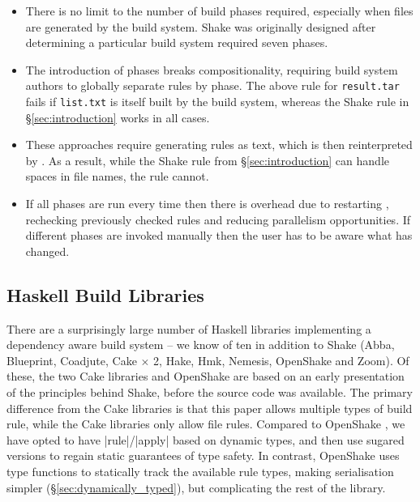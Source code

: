\begin{itemize}
\item There is no limit to the number of build phases required, especially when files are generated by the build system. Shake was originally designed after determining a particular build system required seven phases.
\item The introduction of phases breaks compositionality, requiring build system authors to globally separate rules by phase. The above rule for \texttt{result.tar} fails if \texttt{list.txt} is itself built by the build system, whereas the Shake rule in \S\ref{sec:introduction} works in all cases.
\item These approaches require generating \make{} rules as text, which is then reinterpreted by \make{}. As a result, while the Shake rule from \S\ref{sec:introduction} can handle spaces in file names, the \make{} rule cannot.
\item If all phases are run every time then there is overhead due to restarting \make{}, rechecking previously checked rules and reducing parallelism opportunities. If different phases are invoked manually then the user has to be aware what has changed.
\end{itemize}

\subsection{Haskell Build Libraries}

There are a surprisingly large number of Haskell libraries implementing a dependency aware build system -- we know of ten in addition to Shake (Abba, Blueprint, Coadjute, Cake $\times$ 2, Hake, Hmk, Nemesis, OpenShake and Zoom). Of these, the two Cake libraries and OpenShake are based on an early presentation of the principles behind Shake, before the source code was available. The primary difference from the Cake libraries is that this paper allows multiple types of build rule, while the Cake libraries only allow file rules. Compared to OpenShake \cite{openshake}, we have opted to have |rule|/|apply| based on dynamic types, and then use sugared versions to regain static guarantees of type safety. In contrast, OpenShake uses type functions \cite{schrijvers:type_functions} to statically track the available rule types, making serialisation simpler (\S\ref{sec:dynamically_typed}), but complicating the rest of the library.

